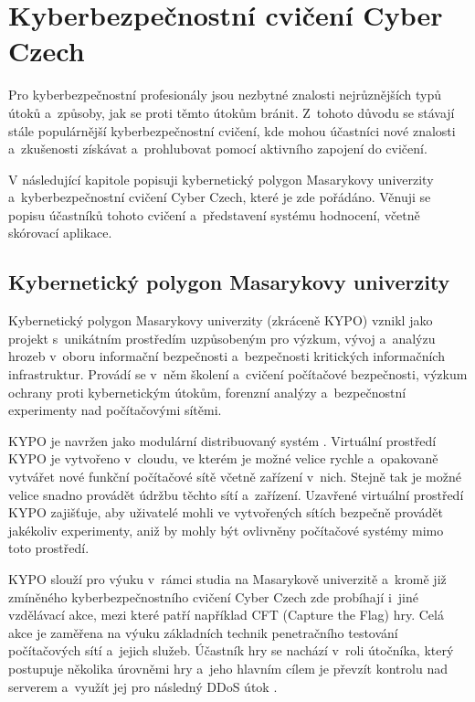 \documentclass[
  digital,
  twoside,
  table, 
  nolof, 
  nolot
]{fithesis3}
\begin{document}
\chapter{Kyberbezpečnostní cvičení Cyber Czech}
\label{cyberex}

Pro kyberbezpečnostní profesionály jsou nezbytné znalosti nejrůznějších typů útoků a~způsoby, jak se proti těmto útokům bránit. Z~tohoto důvodu se stávají stále populárnější kyberbezpečnostní cvičení, kde mohou účastníci nové znalosti a~zkušenosti získávat a~prohlubovat pomocí aktivního zapojení do cvičení.

V následující kapitole popisuji kybernetický polygon Masarykovy univerzity a~kyberbezpečnostní cvičení Cyber Czech, které je zde pořádáno. Věnuji se popisu účastníků tohoto cvičení a~představení systému hodnocení, včetně skórovací aplikace.

\section{Kybernetický polygon Masarykovy univerzity}

Kybernetický polygon Masarykovy univerzity (zkráceně KYPO) vznikl jako projekt s~unikátním prostředím uzpůsobeným pro výzkum, vývoj a~analýzu hrozeb v~oboru informační bezpečnosti a~bezpečnosti kritických informačních infrastruktur. Provádí se v~něm školení a~cvičení počítačové bezpečnosti, výzkum ochrany proti kybernetickým útokům, forenzní analýzy a~bezpečnostní experimenty nad počítačovými sítěmi.

KYPO je navržen jako modulární distribuovaný systém \cite{Vykopal2017KYPOCases}. Virtuální prostředí KYPO je vytvořeno v~cloudu, ve kterém je možné velice rychle a~opakovaně vytvářet nové funkční počítačové sítě včetně zařízení v~nich. Stejně tak je možné velice snadno provádět údržbu těchto sítí a~zařízení. Uzavřené virtuální prostředí KYPO zajišťuje, aby uživatelé mohli ve vytvořených sítích bezpečně provádět jakékoliv experimenty, aniž by mohly být ovlivněny počítačové systémy mimo toto prostředí.

KYPO slouží pro výuku v~rámci studia na Masarykově univerzitě a~kromě již zmíněného kyberbezpečnostního cvičení Cyber Czech zde probíhají i~jiné vzdělávací akce, mezi které patří například CFT (Capture the Flag) hry. Celá akce je zaměřena na výuku základních technik penetračního testování počítačových sítí a~jejich služeb. Účastník hry se nachází v~roli útočníka, který postupuje několika úrovněmi hry a~jeho hlavním cílem je převzít kontrolu nad serverem a~využít jej pro následný DDoS útok \cite{Cegan2015LessonsProject}.
\end{document}
